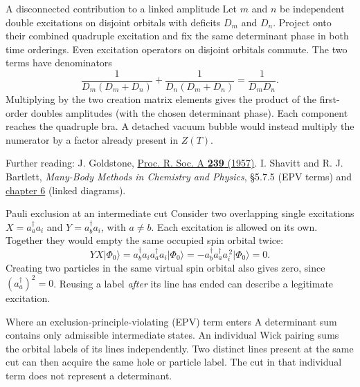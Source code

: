\documentclass[aspectratio=169,10pt]{beamer}
\newcommand{\ket}[1]{\vert #1\rangle}
\newcommand{\cre}[1]{a_{#1}^{\dagger}}
\newcommand{\ann}[1]{a_{#1}}
\newcommand{\ph}{\Phi_0}
\begin{document}
\begin{frame}{A disconnected contribution to a linked amplitude}
Let $m$ and $n$ be independent double excitations on disjoint orbitals with deficits $D_m$ and $D_n$. Project onto their combined quadruple excitation and fix the same determinant phase in both time orderings. Even excitation operators on disjoint orbitals commute. The two terms have denominators
\[
 \frac{1}{D_m(D_m+D_n)}+\frac{1}{D_n(D_m+D_n)}
 =\frac{1}{D_mD_n}.
\]
Multiplying by the two creation matrix elements gives the product of the first-order doubles amplitudes (with the chosen determinant phase). Each component reaches the quadruple bra. A detached vacuum bubble would instead multiply the numerator by a factor already present in $Z(T)$.
\medskip

\footnotesize Further reading: J. Goldstone, \href{https://doi.org/10.1098/rspa.1957.0037}{Proc. R. Soc. A \textbf{239} (1957)}. I. Shavitt and R. J. Bartlett, \emph{Many-Body Methods in Chemistry and Physics}, \S5.7.5 (EPV terms) and \href{https://doi.org/10.1017/CBO9780511596834.007}{chapter 6} (linked diagrams).
\end{frame}

\begin{frame}{Pauli exclusion at an intermediate cut}
Consider two overlapping single excitations $X=\cre{a}\ann{i}$ and $Y=\cre{b}\ann{i}$, with $a\ne b$. Each excitation is allowed on its own. Together they would empty the same occupied spin orbital twice:
\[
 YX\ket{\ph}=\cre{b}\ann{i}\cre{a}\ann{i}\ket{\ph}
 =-\cre{b}\cre{a}\ann{i}^{\,2}\ket{\ph}=0 .
\]
Creating two particles in the same virtual spin orbital also gives zero, since $(\cre{a})^2=0$. Reusing a label \emph{after} its line has ended can describe a legitimate excitation.
\begin{block}{Where an exclusion-principle-violating (EPV) term enters}
A determinant sum contains only admissible intermediate states. An individual Wick pairing sums the orbital labels of its lines independently. Two distinct lines present at the same cut can then acquire the same hole or particle label. The cut in that individual term does not represent a determinant.
\end{block}
\end{frame}
\end{document}
